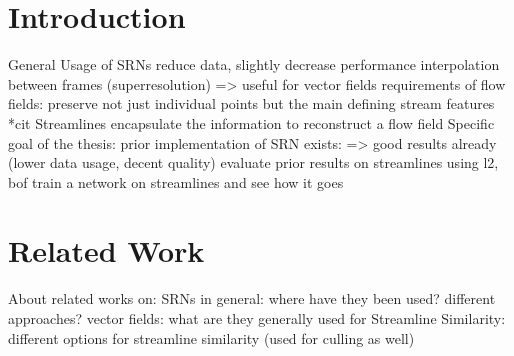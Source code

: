 
\chapter{Introduction}\label{chapter:introduction}
General Usage of SRNs 
  reduce data, slightly decrease performance
  interpolation between frames (superresolution)
=> useful for vector fields
requirements of flow fields:
  preserve not just individual points but the main defining stream features
  *cit Streamlines encapsulate the information to reconstruct a flow field
Specific goal of the thesis:
  prior implementation of SRN exists:
  => good results already (lower data usage, decent quality)
  evaluate prior results on streamlines using l2, bof
  train a network on streamlines and see how it goes

\chapter{Related Work}\label{chapter:related}
About related works on:
SRNs in general:
  where have they been used?
  different approaches?
vector fields:
  what are they generally used for
Streamline Similarity:
  different options for streamline similarity
  (used for culling as well)